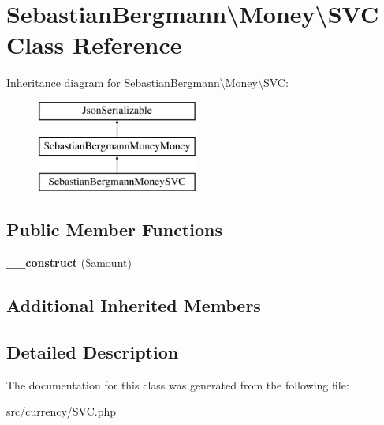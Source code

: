 \hypertarget{classSebastianBergmann_1_1Money_1_1SVC}{}\section{Sebastian\+Bergmann\textbackslash{}Money\textbackslash{}S\+V\+C Class Reference}
\label{classSebastianBergmann_1_1Money_1_1SVC}
Inheritance diagram for Sebastian\+Bergmann\textbackslash{}Money\textbackslash{}S\+V\+C\+:\begin{figure}[H]
\begin{center}
\leavevmode
\includegraphics[height=3.000000cm]{classSebastianBergmann_1_1Money_1_1SVC}
\end{center}
\end{figure}
\subsection*{Public Member Functions}
\begin{DoxyCompactItemize}
\item 
\hypertarget{classSebastianBergmann_1_1Money_1_1SVC_aa778a896b57564bfed04a8a29327ff4f}{}{\bfseries \+\_\+\+\_\+construct} (\$amount)\label{classSebastianBergmann_1_1Money_1_1SVC_aa778a896b57564bfed04a8a29327ff4f}

\end{DoxyCompactItemize}
\subsection*{Additional Inherited Members}


\subsection{Detailed Description}


The documentation for this class was generated from the following file\+:\begin{DoxyCompactItemize}
\item 
src/currency/S\+V\+C.\+php\end{DoxyCompactItemize}
